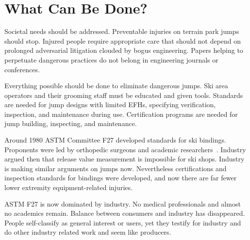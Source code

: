 \documentclass[smallextended]{svjour3}       %
\begin{document}
\section{What Can Be Done?}
\label{sec:action}
%
Societal needs should be addressed. Preventable injuries on terrain park jumps
should stop. Injured people require appropriate care that should not depend on
prolonged adversarial litigation clouded by bogus engineering. Papers helping to
perpetuate dangerous practices do not belong in engineering journals or
conferences.

Everything possible should be done to eliminate dangerous jumps. Ski area
operators and their grooming staff must be educated and given tools. Standards
are needed for jump designs with limited EFHs, specifying verification,
inspection, and maintenance during use. Certification programs are needed for
jump building, inspecting, and maintenance.

Around 1980 ASTM Committee F27 developed standards for ski bindings. Proponents
were led by orthopedic surgeons and academic researchers~\cite{Bahniuk1996}.
Industry argued then that release value measurement is impossible for ski
shops. Industry is making similar arguments on jumps now. Nevertheless
certifications and inspection standards for bindings were developed, and now
there are far fewer lower extremity equipment-related injuries.

ASTM F27 is now dominated by industry. No medical professionals and almost no
academics remain. Balance between consumers and industry has disappeared. People
self-classify as general interest or users, yet they testify for industry and
do other industry related work and seem like producers.

\end{document}
